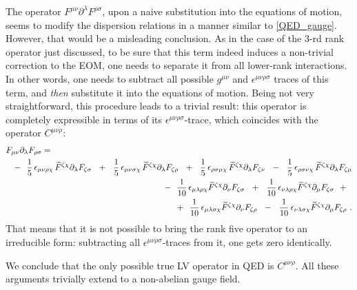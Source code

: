 \documentclass[12pt]{revtex4}
\newcommand{\p}{\partial}
\newcommand{\wt}{\widetilde}
\begin{document}
	The operator
$ F^{\mu\nu} \partial^\lambda F^{\rho\sigma} $,
	upon a naive substitution
	into the equations of motion, 
	seems to modify the dispersion relations in a manner similar to \eqref{QED_gauge}.
	However, that would be a misleading conclusion.
	As in the case of the 3-rd rank operator just discussed,
	to be sure that this term indeed induces a non-trivial 
	correction to the EOM, one needs to separate it from all
	lower-rank interactions.
	In other words, one needs to subtract all possible 
	$ g^{\mu\nu} $ and $ \epsilon^{\mu\nu\rho\sigma} $ 
	traces of this term, and {\it then} substitute it into the
	equations of motion.
	Being not very straightforward, this procedure leads to a 
	trivial result: this operator is completely expressible
	in terms of its $ \epsilon^{\mu\nu\rho\sigma} $-trace, which
	coincides with the operator $ C^{\mu\nu\rho} $:
\begin{eqnarray*}
\lefteqn{
	F_{\mu\nu} \p_\lambda F_{\rho\sigma} = 
	} &&
	\\
	&&
	-~~ 
	\frac{1}{5}\,\epsilon_{\mu\nu\rho\chi} \,
	\wt{F}^{\zeta\chi}\p_\lambda F_{\zeta\sigma} 
 	~~+~~
	\frac{1}{5}\,\epsilon_{\mu\nu\sigma\chi} \,
	\wt{F}^{\zeta\chi}\p_\lambda F_{\zeta\rho} 
	~~+~~
	\frac{1}{5}\,\epsilon_{\rho\sigma\mu\chi} \,
	\wt{F}^{\zeta\chi}\p_\lambda F_{\zeta\nu} 
 	~~-~~
	\frac{1}{5}\,\epsilon_{\rho\sigma\nu\chi} \,
	\wt{F}^{\zeta\chi}\p_\lambda F_{\zeta\mu}
	\\
	&&
	-~~
	\frac{1}{10}\,\epsilon_{\mu\lambda\rho\chi} 
	\wt{F}^{\zeta\chi}\p_\nu F_{\zeta\sigma} 
	~~+~~
	\frac{1}{10}\,\epsilon_{\nu\lambda\rho\chi} 
	\wt{F}^{\zeta\chi}\p_\mu F_{\zeta\sigma} 
	~~+~~
	\\
	&&
	+~~
	\frac{1}{10}\,\epsilon_{\mu\lambda\sigma\chi} 
	\wt{F}^{\zeta\chi}\p_\nu F_{\zeta\rho} 
	~~-~~
	\frac{1}{10}\,\epsilon_{\nu\lambda\sigma\chi} 
	\wt{F}^{\zeta\chi}\p_\mu F_{\zeta\rho}
	~.
\end{eqnarray*}
	That means that it is not possible to bring the rank five operator
	to an irreducible form: subtracting all
	$ \epsilon^{\mu\nu\rho\sigma} $-traces from it, one gets
	zero identically. 

	We conclude that the only possible true
	LV operator in QED is $ C^{\mu\nu\rho} $.  
	All these arguments trivially extend to a non-abelian gauge
	field.
\end{document}
